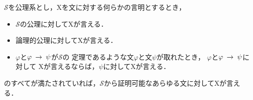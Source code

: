 	
	\begin{screen}
		\begin{metaaxm}[証明に対する構造的帰納法]
		\label{metaaxm:induction_principle_of_proofs}
			$\mathscr{S}$を公理系とし，Xを文に対する何らかの言明とするとき，
			\begin{itemize}
				\item $\mathscr{S}$の公理に対してXが言える．
				\item 論理的公理に対してXが言える．
				\item $\varphi$と$\varphi \hspace{0.25em}\rightarrow\hspace{0.25em} \psi$が$\mathscr{S}$の
					定理であるような文$\varphi$と文$\psi$が取れたとき，
					$\varphi$と$\varphi \hspace{0.25em}\rightarrow\hspace{0.25em} \psi$に対して
					Xが言えるならば，$\psi$に対してXが言える．
			\end{itemize}
			のすべてが満たされていれば，$\mathscr{S}$から証明可能なあらゆる文に対してXが言える．
		\end{metaaxm}
	\end{screen}
	
